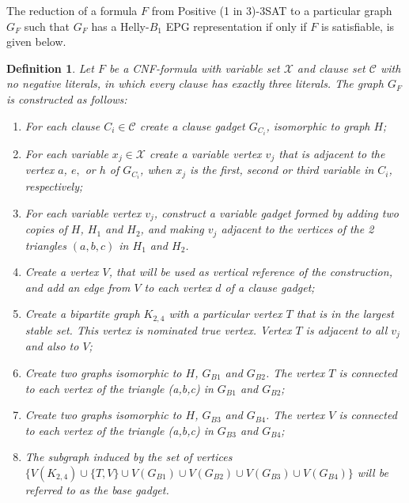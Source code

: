 \documentclass[
submission
]{dmtcs-episciences}
\newtheorem{definition}[theorem]{Definition}
\begin{document}
The reduction of a formula $F$ from  {\sc Positive (1 in 3)-3SAT}  to a particular graph $G_F$ such that $G_F$ has a Helly-$B_1$ EPG representation if only if $F$ is satisfiable, is given below.

\begin{definition}\label{sec:reducao}
Let $F$ be a CNF-formula with variable set $\mathcal{X}$ and clause set $\mathcal{C}$ with no negative literals, in which every clause has exactly three literals. The graph $G_F$ is constructed as follows:

\begin{enumerate}
\item For each clause $C_i \in \mathcal{C}$ create a  \textit{clause gadget} $G_{C_i}$, isomorphic to  graph $H$;

\item For each variable $x_{j}\in \mathcal{X}$ create a \emph{variable vertex} $v_{j}$ that is adjacent to the vertex $a$, $e,$ or $h$ of $G_{C_i}$, when $x_{j}$ is the first, second or third variable in $C_i$, respectively;

\item For each variable vertex $v_{j}$, construct a \emph{variable gadget} formed by adding two copies of $H$, $H_1$ and $H_2$, and making $v_j$ adjacent to the vertices of the 2 triangles $(a, b, c)$ in  $H_1$ and $H_2$.



\item Create a vertex $V$, that will be used as vertical reference of the construction, and add an edge from $V$ to each vertex $d$ of a clause gadget;%

\item Create a bipartite graph $K_{2,4}$ with a particular vertex $T$ that is in the largest stable set. This vertex is nominated \emph{true vertex}. Vertex $T$ is adjacent to all $v_{j}$ and also to $V$;

\item Create two  graphs isomorphic to $H$, $G_{B1}$ and $G_{B2}$. The vertex $T$ is connected to each vertex of the triangle (a,b,c) in $G_{B1}$ and $G_{B2}$;


\item Create two graphs isomorphic  to $H$, $G_{B3}$ and $G_{B4}$. The vertex $V$ is connected to each vertex of the triangle (a,b,c) in $G_{B3}$ and $G_{B4}$;

\item The  subgraph induced by the set of vertices $\{V(K_{2,4}) \cup  \{T, V\} \cup V(G_{B1}) \cup V(G_{B2}) \cup V(G_{B3}) \cup V(G_{B4})\}$ will be referred to as the  \emph{base gadget}. 
\end{enumerate}
\end{definition}
\end{document}

